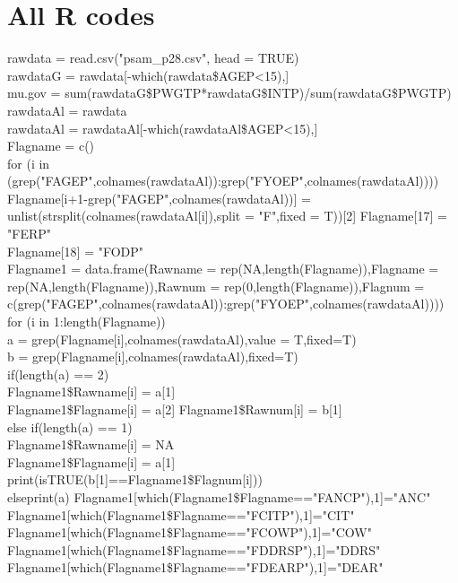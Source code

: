 \documentclass[12pt]{article}
\begin{document}
\section{All R codes}
rawdata = read.csv("psam\_p28.csv", head = TRUE)\\
rawdataG = rawdata[-which(rawdata\$AGEP<15),]\\
mu.gov = sum(rawdataG\$PWGTP*rawdataG\$INTP)/sum(rawdataG\$PWGTP)\\
rawdataAl = rawdata\\
rawdataAl = rawdataAl[-which(rawdataAl\$AGEP<15),]
\\Flagname = c()
\\for (i in (grep("FAGEP",colnames(rawdataAl)):grep("FYOEP",colnames(rawdataAl)))) {
  \\Flagname[i+1-grep("FAGEP",colnames(rawdataAl))] = unlist(strsplit(colnames(rawdataAl[i]),split = "F",fixed = T))[2]
}
Flagname[17] = "FERP"\\
Flagname[18] = "FODP"\\
Flagname1 = data.frame(Rawname = rep(NA,length(Flagname)),Flagname = rep(NA,length(Flagname)),Rawnum = rep(0,length(Flagname)),Flagnum = c(grep("FAGEP",colnames(rawdataAl)):grep("FYOEP",colnames(rawdataAl))))
\\for (i in 1:length(Flagname)) {
  \\a = grep(Flagname[i],colnames(rawdataAl),value = T,fixed=T)
  \\b = grep(Flagname[i],colnames(rawdataAl),fixed=T)
  \\if(length(a) == 2){
    \\Flagname1\$Rawname[i] = a[1]
    \\Flagname1\$Flagname[i] = a[2]
    Flagname1\$Rawnum[i] = b[1]\\
  }else if(length(a) == 1){\\
    Flagname1\$Rawname[i] = NA\\
    Flagname1\$Flagname[i] = a[1]\\
    print(isTRUE(b[1]==Flagname1\$Flagnum[i]))
  \\}else{print(a)}
}
Flagname1[which(Flagname1\$Flagname=="FANCP"),1]="ANC"\\
Flagname1[which(Flagname1\$Flagname=="FCITP"),1]="CIT"\\
Flagname1[which(Flagname1\$Flagname=="FCOWP"),1]="COW"\\
Flagname1[which(Flagname1\$Flagname=="FDDRSP"),1]="DDRS"\\
Flagname1[which(Flagname1\$Flagname=="FDEARP"),1]="DEAR"\\
\end{document}
